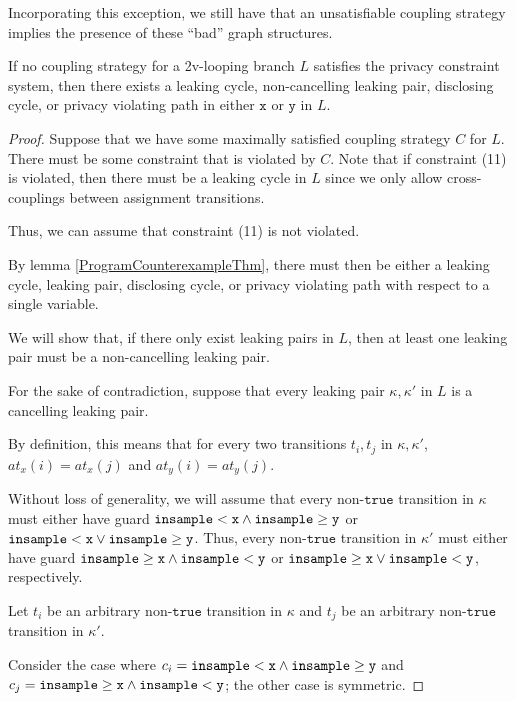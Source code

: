 Incorporating this exception, we still have that an unsatisfiable coupling strategy implies the presence of these ``bad'' graph structures. 

\begin{lemma}
    If no coupling strategy for a 2v-looping branch $L$ satisfies the privacy constraint system, then there exists a leaking cycle, non-cancelling leaking pair, disclosing cycle, or privacy violating path in either $\texttt{x}$ or $\texttt{y}$ in $L$.
\end{lemma}
\begin{proof}
    Suppose that we have some maximally satisfied coupling strategy $C$ for $L$. There must be some constraint that is violated by $C$. Note that if constraint (11) is violated, then there must be a leaking cycle in $L$ since we only allow cross-couplings between assignment transitions. 

    Thus, we can assume that constraint (11) is not violated. 

    By lemma \ref{ProgramCounterexampleThm}, there must then be either a leaking cycle, leaking pair, disclosing cycle, or privacy violating path with respect to a single variable. 

    We will show that, if there only exist leaking pairs in $L$, then at least one leaking pair must be a non-cancelling leaking pair. 

    For the sake of contradiction, suppose that every leaking pair $\kappa, \kappa'$ in $L$ is a cancelling leaking pair. 

    By definition, this means that for every two transitions $t_i, t_j$ in $\kappa, \kappa'$, $at_x(i) = at_x(j)$ and $at_y(i) = at_y(j)$.

    Without loss of generality, we will assume that every non-$\texttt{true}$ transition in $\kappa$ must either have guard $\lguard[\texttt{x}]\land\gguard[\texttt{y}]$ or $\lguard[\texttt{x}]\lor\gguard[\texttt{y}]$. Thus, every non-$\texttt{true}$ transition in $\kappa'$ must either have guard $\gguard[\texttt{x}]\land\lguard[\texttt{y}]$ or $\gguard[\texttt{x}]\lor\lguard[\texttt{y}]$, respectively. 

    Let $t_i$ be an arbitrary non-$\texttt{true}$ transition in $\kappa$ and $t_j$ be an arbitrary non-$\texttt{true}$ transition in $\kappa'$.

    Consider the case where $c_i = \lguard[\texttt{x}]\land\gguard[\texttt{y}]$ and $c_j = \gguard[\texttt{x}]\land\lguard[\texttt{y}]$; the other case is symmetric.


\end{proof}
